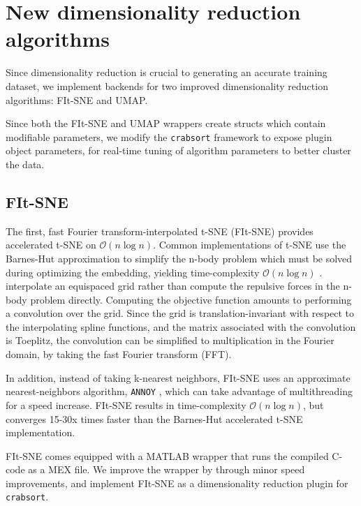\documentclass{article}
\begin{document}
\section{New dimensionality reduction algorithms}

Since dimensionality reduction is crucial to generating an accurate training dataset,
we implement backends for two improved dimensionality reduction algorithms: FIt-SNE and UMAP.

Since both the FIt-SNE and UMAP wrappers create structs which contain modifiable parameters,
we modify the \texttt{crabsort} framework to expose plugin object parameters,
for real-time tuning of algorithm parameters to better cluster the data.

\subsection{FIt-SNE}

The first, fast Fourier transform-interpolated t-SNE (FIt-SNE)
provides accelerated t-SNE on $\mathcal{O}(n \log n)$.
Common implementations of t-SNE use the Barnes-Hut approximation to simplify the n-body problem
which must be solved during optimizing the embedding, yielding time-complexity $\mathcal{O}(n \log n)$ \autocite{vandermaatenAcceleratingTSNEUsing2014}.
\cite{lindermanFastInterpolationbasedTSNE2019} interpolate an equispaced grid
rather than compute the repulsive forces in the n-body problem directly.
Computing the objective function amounts to performing a convolution over the grid.
Since the grid is translation-invariant with respect to the interpolating spline functions,
and the matrix associated with the convolution is Toeplitz,
the convolution can be simplified to multiplication in the Fourier domain,
by taking the fast Fourier transform (FFT).

In addition, instead of taking k-nearest neighbors,
FIt-SNE uses an approximate nearest-neighbors algorithm, \texttt{ANNOY} \autocite{bernhardssonApproximateNearestNeighbors2019},
which can take advantage of multithreading for a speed increase.
FIt-SNE results in time-complexity $\mathcal{O}(n \log n)$,
but converges 15-30x times faster than the Barnes-Hut accelerated t-SNE implementation.

FIt-SNE comes equipped with a MATLAB wrapper that runs the compiled C-code as a MEX file.
We improve the wrapper by through minor speed improvements,
and implement FIt-SNE as a dimensionality reduction plugin for \texttt{crabsort}.
\end{document}
